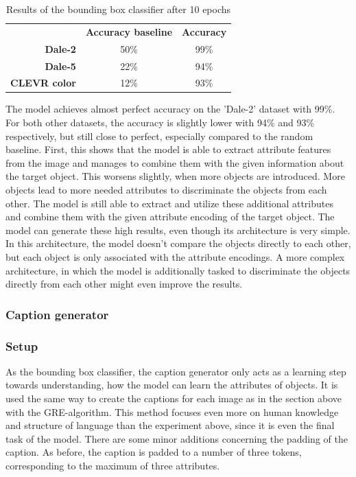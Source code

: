 \begin{table}[h]
    \centering
    \begin{tabular}{rcc}
        \toprule
                             & \textbf{Accuracy baseline} & \textbf{Accuracy} \\
        \textbf{Dale-2}      & 50\%                       & 99\%              \\
        \textbf{Dale-5}      & 22\%                       & 94\%              \\
        \textbf{CLEVR color} & 12\%                       & 93\%              \\
        \bottomrule
    \end{tabular}
    \caption{Results of the bounding box classifier after 10 epochs}
    \label{tab:results_bounding_box_classifier}
\end{table}

The model achieves almost perfect accuracy on the 'Dale-2' dataset with 99\%.
For both other datasets, the accuracy is slightly lower with 94\% and 93\% respectively, but still close to perfect, especially compared to the random baseline.
First, this shows that the model is able to extract attribute features from the image and manages to combine them with the given information about the target object.
This worsens slightly, when more objects are introduced.
More objects lead to more needed attributes to discriminate the objects from each other.
The model is still able to extract and utilize these additional attributes and combine them with the given attribute encoding of the target object.
The model can generate these high results, even though its architecture is very simple.
In this architecture, the model doesn't compare the objects directly to each other, but each object is only associated with the attribute encodings.
A more complex architecture, in which the model is additionally tasked to discriminate the objects directly from each other might even improve the results.

\subsubsection{Caption generator}
\subsubsection*{Setup}

As the bounding box classifier, the caption generator only acts as a learning step towards understanding, how the model can learn the attributes of objects.
It is used the same way to create the captions for each image as in the section above with the GRE-algorithm.
This method focuses even more on human knowledge and structure of language than the experiment above, since it is even the final task of the model.
There are some minor additions concerning the padding of the caption.
As before, the caption is padded to a number of three tokens, corresponding to the maximum of three attributes.


